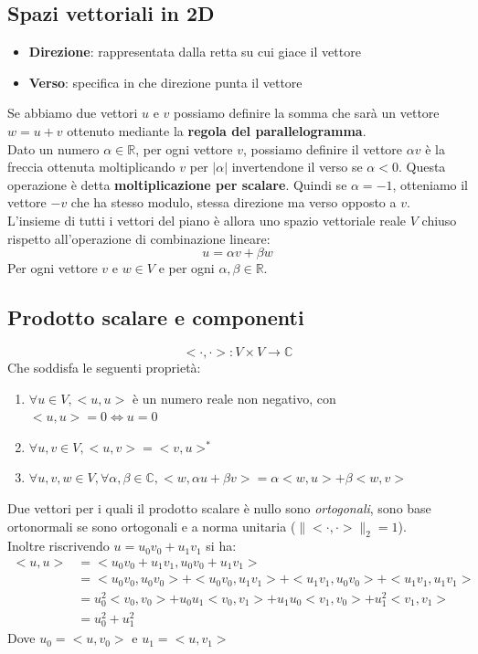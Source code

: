 \documentclass[12pt, a4paper]{report}
\begin{document}
\subsection{Spazi vettoriali in 2D}
\begin{itemize}
    \item \textbf{Direzione}: rappresentata dalla retta su cui giace il vettore
    \item \textbf{Verso}:  specifica in che direzione punta il vettore
\end{itemize}
Se abbiamo due vettori $u$ e $v$ possiamo definire la somma che sarà un vettore $w=u+v$ ottenuto mediante la \textbf{regola del parallelogramma}.\\
Dato un numero $\alpha\in \mathbb{R}$, per ogni vettore $v$, possiamo definire il vettore $\alpha v$ è la freccia ottenuta moltiplicando $v$ per $|\alpha|$ invertendone il verso se $\alpha < 0$. Questa operazione è detta \textbf{moltiplicazione per scalare}. Quindi se $\alpha = -1$, otteniamo il vettore $-v$ che ha stesso modulo, stessa direzione ma verso opposto a $v$.\\
L'insieme di tutti i vettori del piano è allora uno spazio vettoriale reale $V$ chiuso rispetto all'operazione di combinazione lineare:
\begin{equation*}
    u = \alpha v + \beta w
\end{equation*}
Per ogni vettore $v$ e $w \in V$ e per ogni $\alpha, \beta \in \mathbb{R}$.
\subsection{Prodotto scalare e componenti}
\begin{equation*}
    < \cdot, \cdot > : V \times V \rightarrow \mathbb{C}
\end{equation*}
Che soddisfa le seguenti proprietà:
\begin{enumerate}
    \item $\forall u\in V, <u,u>$ è un numero reale non negativo, con $<u,u>=0 \iff u=0$
    \item $\forall u,v \in V, <u,v>=<v,u>^{*}$
    \item $\forall u,v,w \in V,\forall \alpha,\beta \in \mathbb{C}, <w,\alpha u+\beta v>=\alpha<w,u>+\beta<w,v>$
\end{enumerate}
Due vettori per i quali il prodotto scalare è nullo sono \textit{ortogonali}, sono base ortonormali se sono ortogonali e a norma unitaria ($\lVert <\cdot,\cdot>\rVert_{2}=1$).\\
Inoltre riscrivendo $u=u_{0}v_{0}+u_{1}v_{1}$ si ha:
\begin{equation*}
    \begin{split}
        <u,u>&=<u_{0}v_{0}+u_{1}v_{1},u_{0}v_{0}+u_{1}v_{1}>\\
        &=<u_{0}v_{0},u_{0}v_{0}>+<u_{0}v_{0},u_{1}v_{1}>+<u_{1}v_{1},u_{0}v_{0}>+<u_{1}v_{1},u_{1}v_{1}>\\
        &=u_{0}^{2}<v_{0},v_{0}>+u_{0}u_{1}<v_{0},v_{1}>+u_{1}u_{0}<v_{1},v_{0}>+u_{1}^{2}<v_{1},v_{1}>\\
        &=u_{0}^{2}+u_{1}^{2}
    \end{split}
\end{equation*}
Dove $u_{0}=<u,v_{0}>$ e $u_{1}=<u,v_{1}>$
\end{document}
